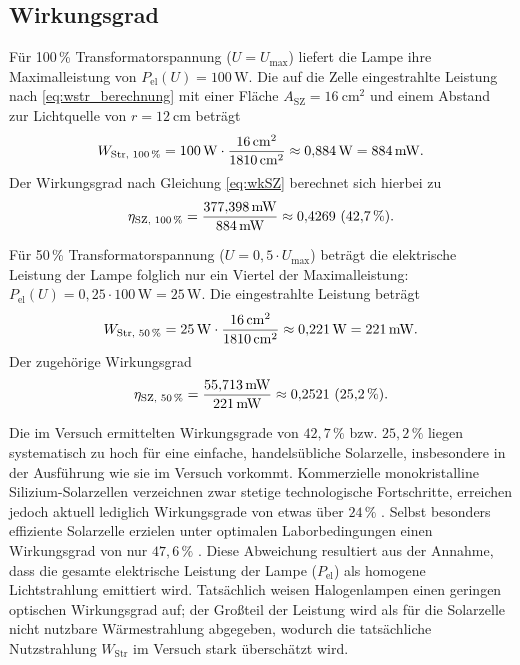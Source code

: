 \documentclass[11pt,a4paper]{article}
\numberwithin{equation}{section}
\begin{document}
\subsection{Wirkungsgrad}


Für 100\,\% Transformatorspannung ($U = U_\text{max}$) liefert die Lampe ihre Maximalleistung von $P_\text{el}(U) = 100\,\mathrm{W}$. Die auf die Zelle eingestrahlte Leistung nach \ref{eq:wstr_berechnung} mit einer Fl\"ache $A_{\text{SZ}} = \qty{16}{\centi\meter\squared}$ und einem Abstand zur Lichtquelle von $r = \qty{12}{\centi\meter}$ betr\"agt
\begin{equation}
W_\text{Str, 100\,\%} = 100\,\mathrm{W} \cdot \frac{16\,\mathrm{cm}^2}{1810\,\mathrm{cm}^2} \approx 0{,}884\,\mathrm{W} = 884\,\mathrm{mW}.
\end{equation}
Der Wirkungsgrad nach Gleichung \ref{eq:wkSZ} berechnet sich hierbei zu
\begin{equation}
\eta_\text{SZ, 100\,\%} = \frac{377{,}398\,\mathrm{mW}}{884\,\mathrm{mW}} \approx 0{,}4269\ (42{,}7\,\%).
\end{equation}

\noindent Für 50\,\% Transformatorspannung ($U = 0{,}5 \cdot U_\text{max}$) beträgt die elektrische Leistung der Lampe folglich nur ein Viertel der Maximalleistung: $P_\text{el}(U) = 0{,}25 \cdot 100\,\mathrm{W} = 25\,\mathrm{W}$.
Die eingestrahlte Leistung beträgt 
\begin{equation}
W_\text{Str, 50\,\%} = 25\,\mathrm{W} \cdot \frac{16\,\mathrm{cm}^2}{1810\,\mathrm{cm}^2} \approx 0{,}221\,\mathrm{W} = 221\,\mathrm{mW}.
\end{equation}
Der zugehörige Wirkungsgrad
\begin{equation}
\eta_\text{SZ, 50\,\%} = \frac{55{,}713\,\mathrm{mW}}{221\,\mathrm{mW}} \approx 0{,}2521\ (25{,}2\,\%).
\end{equation}

\noindent Die im Versuch ermittelten Wirkungsgrade von $42{,}7\,\%$ bzw. $25{,}2\,\%$ liegen systematisch zu hoch f\"ur eine einfache, handels\"ubliche Solarzelle, insbesondere in der Ausf\"uhrung wie sie im Versuch vorkommt. Kommerzielle monokristalline Silizium-Solarzellen verzeichnen zwar stetige technologische Fortschritte, erreichen jedoch aktuell lediglich Wirkungsgrade von etwas \"uber $24\,\%$ \cite{fraunhofer_ise_report_2024}. Selbst besonders effiziente Solarzelle erzielen unter optimalen Laborbedingungen einen Wirkungsgrad von nur $47{,}6\,\%$ \cite{fraunhofer_ise_2022}. 
\newline Diese Abweichung resultiert aus der Annahme, dass die gesamte elektrische Leistung der Lampe ($P_\text{el}$) als homogene Lichtstrahlung emittiert wird. Tatsächlich weisen Halogenlampen einen geringen optischen Wirkungsgrad auf; der Großteil der Leistung wird als für die Solarzelle nicht nutzbare Wärmestrahlung abgegeben, wodurch die tatsächliche Nutzstrahlung $W_\text{Str}$ im Versuch stark überschätzt wird.
\end{document}
